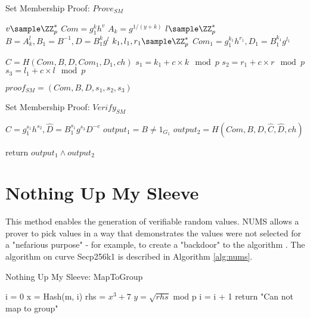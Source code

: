 \begin{algorithm}
 \caption{Set Membership Proof: $Prove_{SM}$}
    \label{alg:prove_sm}
    \LinesNumbered
    
    
    $v \sample \ZZ_p^*$\;
    $Com = g_1^k h^v$ \;
    $A_k = g^{1/(y+k)}$ \;
    $l \sample \ZZ_p^*$ \;
    $B = A_k^l, B_1 = B^{-1}, D = B_1^kg^l$ \;
    $k_1, l_1, r_1 \sample \ZZ_p^*$ \;
    $Com_1 = g_1^{k_1}h^{r_1}, D_1 = B_1^{k_1} g^{l_1}$ \;
    
    $C = H(Com, B, D, Com_1, D_1, ch)$ \;
    $s_1 = k_1 + c \times k \mod p$ \;
    $s_2 = r_1 + c \times r \mod p$ \;
    $s_3 = l_1 + c \times l \mod p$ \;
    
    $proof_{SM} = (Com, B, D, s_1, s_2, s_3)$
\end{algorithm}

\begin{algorithm}
 \caption{Set Membership Proof: $Verify_{SM}$}
    \label{alg:verify_sm}
    \LinesNumbered
    
    
    $\hat{C} = g_1^{s_1}h^{s_2}, \hat{D} = B_1^{s_1}g^{s_3}D^{-c}$ \;
    $output_1 = B \neq 1_{G_1}$ \;
    $output_2 = H(Com, B, D, \hat{C}, \hat{D}, ch)$ \;
    
    return $output_1 \land output_2$
\end{algorithm}

\section{Nothing Up My Sleeve}
\label{appendex:NUMS}
This method enables the generation of verifiable random values. NUMS allows a prover to pick values in a way that demonstrates the values were not selected for a "nefarious purpose" - for example, to create a "backdoor" to the algorithm \cite{black2014elliptic}. The algorithm on curve Secp256k1 is described in Algorithm \ref{alg:nums}.

\begin{algorithm}
 \caption{Nothing Up My Sleeve: MapToGroup}
    \label{alg:nums}
    \LinesNumbered
    
    i = 0 \;
     {
        x = Hash(m, i) \;
        rhs = $x^3 + 7$ \;
         {
            $y = \sqrt{rhs}$ mod p \;
        }
        i = i + 1\;
    }
    return "Can not map to group"\;
\end{algorithm}